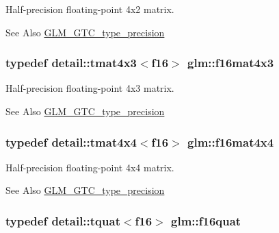 Half-\/precision floating-\/point 4x2 matrix. 

\begin{DoxySeeAlso}{See Also}
\hyperlink{group__gtc__type__precision}{G\-L\-M\-\_\-\-G\-T\-C\-\_\-type\-\_\-precision} 
\end{DoxySeeAlso}
\hypertarget{group__gtc__type__precision_gaa0c9c69c19bf90bb73e455a1e61f7114}{
\subsubsection[{f16mat4x3}]{\setlength{\rightskip}{0pt plus 5cm}typedef detail\-::tmat4x3$<$f16$>$ {\bf glm\-::f16mat4x3}}}\label{group__gtc__type__precision_gaa0c9c69c19bf90bb73e455a1e61f7114}


Half-\/precision floating-\/point 4x3 matrix. 

\begin{DoxySeeAlso}{See Also}
\hyperlink{group__gtc__type__precision}{G\-L\-M\-\_\-\-G\-T\-C\-\_\-type\-\_\-precision} 
\end{DoxySeeAlso}
\hypertarget{group__gtc__type__precision_gaf9b9286a90e95701746631e00c08697a}{
\subsubsection[{f16mat4x4}]{\setlength{\rightskip}{0pt plus 5cm}typedef detail\-::tmat4x4$<$f16$>$ {\bf glm\-::f16mat4x4}}}\label{group__gtc__type__precision_gaf9b9286a90e95701746631e00c08697a}


Half-\/precision floating-\/point 4x4 matrix. 

\begin{DoxySeeAlso}{See Also}
\hyperlink{group__gtc__type__precision}{G\-L\-M\-\_\-\-G\-T\-C\-\_\-type\-\_\-precision} 
\end{DoxySeeAlso}
\hypertarget{group__gtc__type__precision_gaf88b8ffe0545265127f072a73725337f}{
\subsubsection[{f16quat}]{\setlength{\rightskip}{0pt plus 5cm}typedef detail\-::tquat$<$f16$>$ {\bf glm\-::f16quat}}}\label{group__gtc__type__precision_gaf88b8ffe0545265127f072a73725337f}


